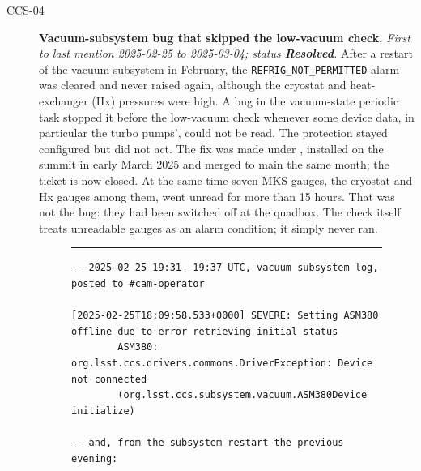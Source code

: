 \begin{description}
\item[CCS-04]\label{iss:CCS-04} \textbf{Vacuum-subsystem bug that skipped the low-vacuum check.}
  \emph{First to last mention 2025-02-25 to 2025-03-04; status \textcolor{stres}{\textbf{Resolved}}.}
  After a restart of the vacuum subsystem in February, the \texttt{REFRIG\_NOT\_PERMITTED} alarm was cleared and never raised again, although the cryostat and heat-exchanger (Hx) pressures were high.  A bug in the vacuum-state periodic task stopped it before the low-vacuum check whenever some device data, in particular the turbo pumps', could not be read.  The protection stayed configured but did not act.  The fix was made under , installed on the summit in early March 2025 and merged to main the same month; the ticket is now closed.  At the same time seven MKS gauges, the cryostat and Hx gauges among them, went unread for more than 15 hours.  That was not the bug: they had been switched off at the quadbox.  The check itself treats unreadable gauges as an alarm condition; it simply never ran.

\begin{figure}[H]
\centering
\begin{minipage}{\textwidth}
\hrule\vspace{4pt}
\begingroup\scriptsize
\begin{verbatim}
-- 2025-02-25 19:31--19:37 UTC, vacuum subsystem log, posted to #cam-operator

[2025-02-25T18:09:58.533+0000] SEVERE: Setting ASM380 offline due to error retrieving initial status
        ASM380: org.lsst.ccs.drivers.commons.DriverException: Device not connected
        (org.lsst.ccs.subsystem.vacuum.ASM380Device initialize)

-- and, from the subsystem restart the previous evening:


\end{verbatim}
\end{minipage}
\end{figure}
\end{description}
